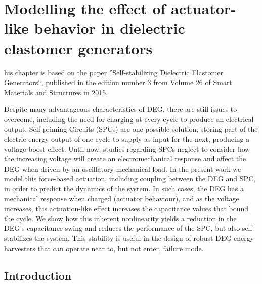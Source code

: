 
\let\textcircled=\pgftextcircled
\chapter{Modelling the effect of actuator-like behavior in dielectric elastomer generators}
\label{chap:1}

his chapter is based on the paper ''Self-stabilizing Dielectric Elastomer Generators``, published in the edition number 3 from Volume 26 of Smart Materials and Structures in 2015.

Despite many advantageous characteristics of DEG, there are still issues to overcome, including the need for charging at every cycle to produce an electrical output. Self-priming Circuits (SPCs) are one possible solution, storing part of the electric energy output of one cycle to supply as input for the next, producing a voltage boost effect. Until now, studies regarding SPCs neglect to consider how the increasing voltage will create an electromechanical response and affect the DEG when driven by an oscillatory mechanical load. In the present work we model this force-based actuation, including coupling between the DEG and SPC, in order to predict the dynamics of the system. In such cases, the DEG has a mechanical response when charged (actuator behaviour), and as the voltage increases, this actuation-like effect increases the capacitance values that bound the cycle. We show how this inherent nonlinearity yields a reduction in the DEG’s capacitance swing and reduces the performance of the SPC, but also self-stabilizes the system.  This stability is useful in the design of robust DEG energy harvesters that can operate near to, but not enter, failure mode.




\section{Introduction}
\label{sec:intro}

